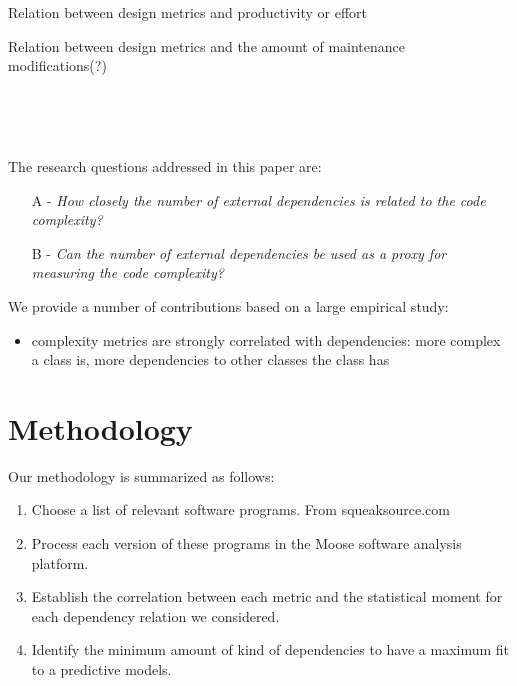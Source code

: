 \documentclass{sig-alternate}
\newcommand{\seclabel}[1]{\label{sec:#1}}
\begin{document}
Relation between design metrics and productivity or effort ~\cite{Chida98a}

Relation between design metrics and the amount of maintenance modifications(?)~\cite{Li93a}




~\cite{Baxt06a}

~\cite{Taub11a}


The research questions addressed in this paper are:
\begin{itemize}
\item[A -] \emph{How closely the number of external dependencies is related to the code complexity?}
\item[B -] \emph{Can the number of external dependencies be used as a proxy for measuring the code complexity?}
\end{itemize}

We provide a number of contributions based on a large empirical study:
\begin{itemize}
\item complexity metrics are strongly correlated with dependencies: more complex a class is, more dependencies to other classes the class has
\end{itemize}


\section{Methodology}\seclabel{methodology}

Our methodology is summarized as follows:

\begin{enumerate}
\item Choose a list of relevant software programs. From squeaksource.com
\item Process each version of these programs in the Moose software analysis platform. 
\item Establish the correlation between each metric and the statistical moment for each dependency relation we considered.
\item Identify the minimum amount of kind of dependencies to have a maximum fit to a predictive models.
\end{enumerate}
\end{document}
